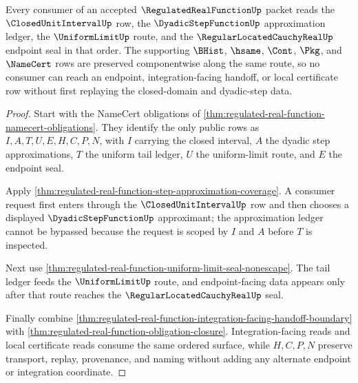 \begin{theorem}
\label{thm:regulatedrealfunction-uniform-step-route}
Every consumer of an accepted $\RegulatedRealFunctionUp$ packet reads the $\ClosedUnitIntervalUp$ row, the $\DyadicStepFunctionUp$ approximation ledger, the $\UniformLimitUp$ route, and the $\RegularLocatedCauchyRealUp$ endpoint seal in that order. The supporting $\BHist$, $\hsame$, $\Cont$, $\Pkg$, and $\NameCert$ rows are preserved componentwise along the same route, so no consumer can reach an endpoint, integration-facing handoff, or local certificate row without first replaying the closed-domain and dyadic-step data.
\end{theorem}
\begin{proof}
Start with the NameCert obligations of \autoref{thm:regulated-real-function-namecert-obligations}. They identify the only public rows as $I,A,T,U,E,H,C,P,N$, with $I$ carrying the closed interval, $A$ the dyadic step approximations, $T$ the uniform tail ledger, $U$ the uniform-limit route, and $E$ the endpoint seal.

Apply \autoref{thm:regulated-real-function-step-approximation-coverage}. A consumer request first enters through the $\ClosedUnitIntervalUp$ row and then chooses a displayed $\DyadicStepFunctionUp$ approximant; the approximation ledger cannot be bypassed because the request is scoped by $I$ and $A$ before $T$ is inspected.

Next use \autoref{thm:regulated-real-function-uniform-limit-seal-nonescape}. The tail ledger feeds the $\UniformLimitUp$ route, and endpoint-facing data appears only after that route reaches the $\RegularLocatedCauchyRealUp$ seal.

Finally combine \autoref{thm:regulated-real-function-integration-facing-handoff-boundary} with \autoref{thm:regulated-real-function-obligation-closure}. Integration-facing reads and local certificate reads consume the same ordered surface, while $H,C,P,N$ preserve transport, replay, provenance, and naming without adding any alternate endpoint or integration coordinate.
\end{proof}

